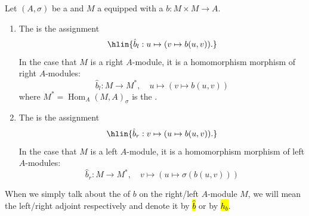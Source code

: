 
\begin{definition} \label{definition:adjoint_map_of_a_sesquilinear_form_on_a_module_over_a_ring_with_involution}
Let $(A, \sigma)$ be a  and $M$ a  equipped with a  $b: M \times M \to A$. 

\begin{enumerate}
    \item The  is the assignment
    $$\hlin{\hat{b}_l: u \mapsto (v \mapsto b(u, v)).}$$
    In the case that $M$ is a right $A$-module, it is a homomorphism 
    morphism of right $A$-modules:
    $$ \hat{b}_l: M \to M^*, \quad u \mapsto (v \mapsto b(u, v)) $$
    where $M^* = \operatorname{Hom}_A(M, A)_\sigma$ is the .
    \item The  is the assignment
    $$\hlin{\hat{b}_r: v \mapsto (u \mapsto b(u, v)).}$$
    In the case that $M$ is a left $A$-module, it is a homomorphism 
    morphism of left $A$-modules:
    $$ \hat{b}_r: M \to M^*, \quad v \mapsto (u \mapsto \sigma(b(u, v))) $$
\end{enumerate}

When we simply talk about the  of $b$ on the right/left $A$-module $M$, we will mean the left/right adjoint respectively and denote it by \hl{$\hat{b}$} or by \hl{$h_b$}.
\end{definition}